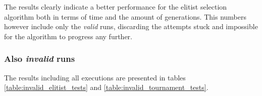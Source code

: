 \documentclass[a4paper]{article}
\begin{document}
The results clearly indicate a better performance for the elitist selection algorithm both in terms of time and the amount of generations. This numbers however include only the
\textit{valid} runs, discarding the attempts stuck and impossible for the algorithm to progress any further.

\subsubsection{Also \textit{invalid} runs}

The results including all executions are presented in tables \ref{table:invalid_elitist_tests} and \ref{table:invalid_tournament_tests}.

\begin{table}[h]
\centering
\caption{Elitist selection}
\label{table:invalid_elitist_tests}
\end{table}

\begin{table}[h]
\centering
\caption{Tournament selection}
\label{table:invalid_tournament_tests}
\end{table}
\end{document}
